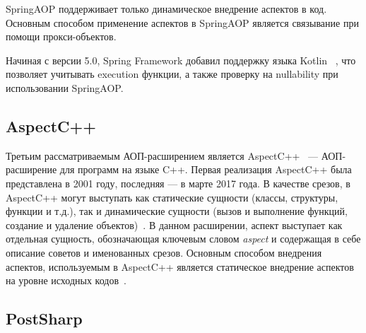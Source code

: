 \documentclass[conference]{IEEEtran}
\begin{document}
SpringAOP поддерживает только динамическое внедрение аспектов в код.
Основным способом применение аспектов в SpringAOP является связывание при
помощи прокси-объектов.

Начиная с версии 5.0, Spring Framework добавил поддержку языка Kotlin
~\cite{springAOP_5_release}, что позволяет учитывать execution функции, а также
проверку на nullability при использовании SpringAOP.

\subsection{AspectC++}
Третьим рассматриваемым АОП-расширением является AspectC++~
\cite{aspectC_homepage} --- АОП-расширение для программ на языке C++.
Первая реализация AspectC++ была представлена в 2001 году, последняя --- в марте
2017 года.
В качестве срезов, в AspectC++ могут выступать как статические сущности (классы,
структуры, функции и т.д.), так и динамические сущности (вызов и выполнение
функций, создание и удаление объектов)~\cite{aspectC_doc}.
В данном расширении, аспект выступает как отдельная сущность, обозначающая
ключевым словом \textit{aspect} и содержащая в себе описание советов и
именованных срезов.
Основным способом внедрения аспектов, используемым в AspectC++ является
статическое внедрение аспектов на уровне исходных кодов~\cite{aspectC_overview}.
\subsection{PostSharp}
\end{document}
